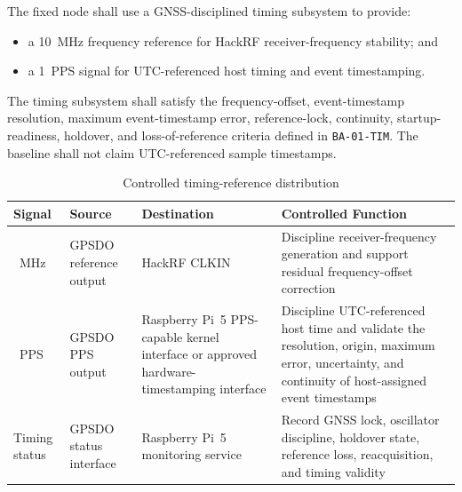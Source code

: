 \documentclass[11pt,a4paper]{article}
\begin{document}
	The fixed node shall use a GNSS-disciplined timing subsystem to provide:
	
	\begin{itemize}[leftmargin=*]
		\item a 10~MHz frequency reference for HackRF receiver-frequency
		stability; and
		\item a 1~PPS signal for UTC-referenced host timing and event
		timestamping.
	\end{itemize}
	
	The timing subsystem shall satisfy the frequency-offset, event-timestamp
	resolution, maximum event-timestamp error, reference-lock, continuity,
	startup-readiness, holdover, and loss-of-reference criteria defined in
	\texttt{BA-01-TIM}. The baseline shall not claim UTC-referenced sample
	timestamps.
	
	\begin{table}[htbp]
		\centering
		\small
		\renewcommand{\arraystretch}{1.2}
		\begin{tabularx}{\columnwidth}{
				>{\raggedright\arraybackslash}p{1.6cm}
				>{\raggedright\arraybackslash}p{2.4cm}
				>{\raggedright\arraybackslash}p{3.4cm}
				>{\raggedright\arraybackslash}X}
			\toprule
			\textbf{Signal} &
			\textbf{Source} &
			\textbf{Destination} &
			\textbf{Controlled Function} \\
			\midrule
			
			
			10~MHz &
			GPSDO reference output &
			HackRF CLKIN &
			Discipline receiver-frequency generation and support residual
			frequency-offset correction \\
			
			1~PPS &
			GPSDO PPS output &
			Raspberry Pi~5 PPS-capable kernel interface or approved
			hardware-timestamping interface &
			Discipline UTC-referenced host time and validate the resolution, origin,
			maximum error, uncertainty, and continuity of host-assigned event timestamps \\
			
			Timing status &
			GPSDO status interface &
			Raspberry Pi~5 monitoring service &
			Record GNSS lock, oscillator discipline, holdover state,
			reference loss, reacquisition, and timing validity \\
			
			\bottomrule
		\end{tabularx}
		\caption{Controlled timing-reference distribution}
		\label{tab:timing}
		
		
	\end{table}
	
\end{document}
